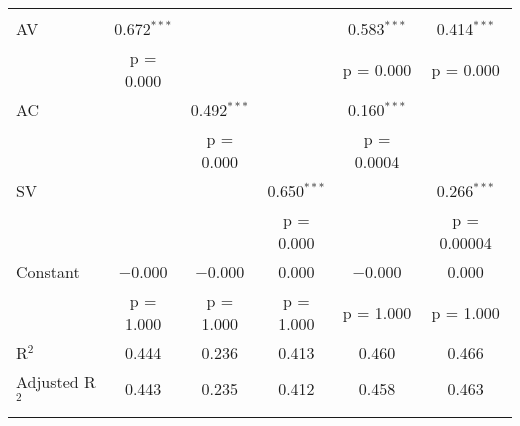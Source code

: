 
\begin{tabular}{@{\extracolsep{5pt}}lccccc} 
\\ 
\hline \\[-1.8ex] 
 AV & 0.672$^{***}$ &  &  & 0.583$^{***}$ & 0.414$^{***}$ \\ 
  & p = 0.000 &  &  & p = 0.000 & p = 0.000 \\ 
 AC &  & 0.492$^{***}$ &  & 0.160$^{***}$ &  \\ 
  &  & p = 0.000 &  & p = 0.0004 &  \\ 
 SV &  &  & 0.650$^{***}$ &  & 0.266$^{***}$ \\ 
  &  &  & p = 0.000 &  & p = 0.00004 \\ 
 Constant & $-$0.000 & $-$0.000 & 0.000 & $-$0.000 & 0.000 \\ 
  & p = 1.000 & p = 1.000 & p = 1.000 & p = 1.000 & p = 1.000 \\ 
R$^{2}$ & 0.444 & 0.236 & 0.413 & 0.460 & 0.466 \\ 
Adjusted R$^{2}$ & 0.443 & 0.235 & 0.412 & 0.458 & 0.463 \\ 
\hline \\[-1.8ex] 
\end{tabular} 

